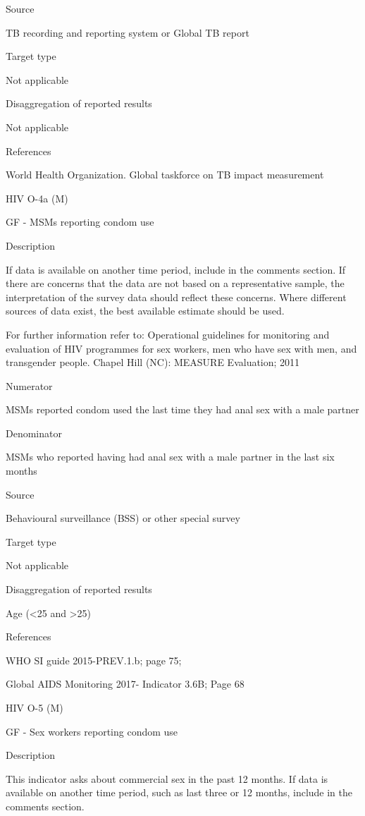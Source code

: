 \documentclass[]{book}
\begin{document}
Source

TB recording and reporting system or Global TB report

Target type

Not applicable

Disaggregation of reported results

Not applicable

References

World Health Organization. Global taskforce on TB impact measurement

HIV O-4a (M)

GF - MSMs reporting condom use

Description

If data is available on another time period, include in the comments section.
If there are concerns that the data are not based on a representative sample, the interpretation of the survey data should reflect these concerns. Where different sources of data exist, the best available estimate should be used.

For further information refer to:
Operational guidelines for monitoring and evaluation of HIV programmes for sex workers, men who have sex with men, and transgender people. Chapel Hill (NC): MEASURE Evaluation; 2011

Numerator

MSMs reported condom used the last time they had anal sex with a male partner

Denominator

MSMs who reported having had anal sex with a male partner in the last six months

Source

Behavioural surveillance (BSS) or other special survey

Target type

Not applicable

Disaggregation of reported results

Age (\textless{}25 and \textgreater{}25)

References

WHO SI guide 2015-PREV.1.b; page 75;

Global AIDS Monitoring 2017- Indicator 3.6B; Page 68

HIV O-5 (M)

GF - Sex workers reporting condom use

Description

This indicator asks about commercial sex in the past 12 months. If data is available on another time period, such as last three or 12 months, include in the comments section.
\end{document}
